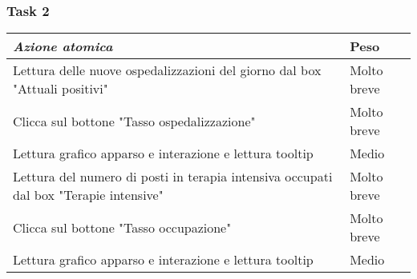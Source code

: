 \subsubsection{Task 2}
\label{sss:iaa-task-2}

{
\renewcommand{\arraystretch}{2}
\begin{longtable}[h]{| p{14cm} | p{2.5cm} |}
    \hline
    \textit{Azione atomica} & \textbf{Peso} \\
    \hline
    \endhead
    Lettura delle nuove ospedalizzazioni del giorno dal box "Attuali positivi" & Molto breve \\
    \hline
    Clicca sul bottone "Tasso ospedalizzazione" & Molto breve  \\
    \hline
    Lettura grafico apparso e interazione e lettura tooltip & Medio \\
    \hline
    Lettura del numero di posti in terapia intensiva occupati dal box "Terapie intensive" & Molto breve \\
    \hline
    Clicca sul bottone "Tasso occupazione" & Molto breve \\
    \hline
    Lettura grafico apparso e interazione e lettura tooltip & Medio \\
    \hline
\end{longtable}
}
